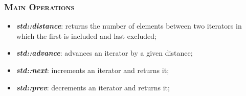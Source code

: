 \documentclass[10pt]{article}
\begin{document}
\begin{multicols*}{5}
{\subsubsection*{\textsc{Main Operations}} 
\begin{itemize}[leftmargin=*,topsep=0.25pt]
  \setlength\itemsep{.3pt}
	\item  \emph{\textbf{std::distance}}: returns the number of elements between two iterators in which the first is included and last excluded;
	\item  \emph{\textbf{std::advance}}: advances an iterator by a given distance;
	\item  \emph{\textbf{std::next}}: increments an iterator and returns it;
	\item  \emph{\textbf{std::prev}}: decrements an iterator and returns it;
\end{itemize}
}
\end{multicols*}
\end{document}
